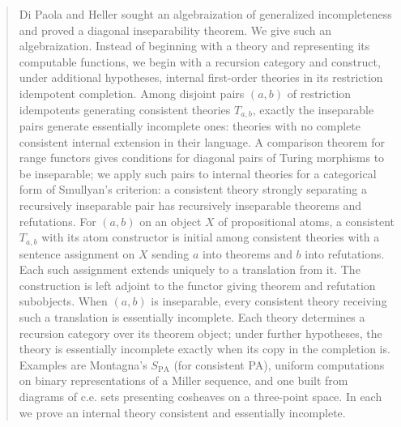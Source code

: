 \begin{abstract}
Di Paola and Heller sought an algebraization of generalized incompleteness and proved a diagonal inseparability theorem. We give such an algebraization. Instead of beginning with a theory and representing its computable functions, we begin with a recursion category and construct, under additional hypotheses, internal first-order theories in its restriction idempotent completion. Among disjoint pairs $(a,b)$ of restriction idempotents generating consistent theories $T_{a,b}$, exactly the inseparable pairs generate essentially incomplete ones: theories with no complete consistent internal extension in their language. A comparison theorem for range functors gives conditions for diagonal pairs of Turing morphisms to be inseparable; we apply such pairs to internal theories for a categorical form of Smullyan's criterion: a consistent theory strongly separating a recursively inseparable pair has recursively inseparable theorems and refutations. For $(a,b)$ on an object $X$ of propositional atoms, a consistent $T_{a,b}$ with its atom constructor is initial among consistent theories with a sentence assignment on $X$ sending $a$ into theorems and $b$ into refutations. Each such assignment extends uniquely to a translation from it. The construction is left adjoint to the functor giving theorem and refutation subobjects. When $(a,b)$ is inseparable, every consistent theory receiving such a translation is essentially incomplete. Each theory determines a recursion category over its theorem object; under further hypotheses, the theory is essentially incomplete exactly when its copy in the completion is. Examples are Montagna's $S_{\mathrm{PA}}$ (for consistent PA), uniform computations on binary representations of a Miller sequence, and one built from diagrams of c.e. sets presenting cosheaves on a three-point space. In each we prove an internal theory consistent and essentially incomplete.
\end{abstract}
